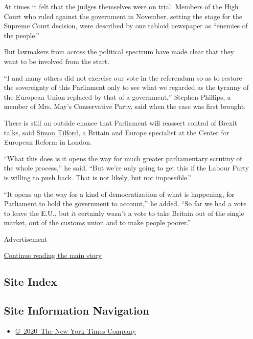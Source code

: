 At times it felt that the judges themselves were on trial. Members of
the High Court who ruled against the government in November, setting the
stage for the Supreme Court decision, were described by one tabloid
newspaper as ``enemies of the people.''

But lawmakers from across the political spectrum have made clear that
they want to be involved from the start.

``I and many others did not exercise our vote in the referendum so as to
restore the sovereignty of this Parliament only to see what we regarded
as the tyranny of the European Union replaced by that of a government,''
Stephen Phillips, a member of Mrs. May's Conservative Party, said when
the case was first brought.

There is still an outside chance that Parliament will reassert control
of Brexit talks, said
\href{https://www.cer.org.uk/personnel/simon-tilford}{Simon Tilford}, a
Britain and Europe specialist at the Center for European Reform in
London.

``What this does is it opens the way for much greater parliamentary
scrutiny of the whole process,'' he said. ``But we're only going to get
this if the Labour Party is willing to push back. That is not likely,
but not impossible.''

``It opens up the way for a kind of democratization of what is
happening, for Parliament to hold the government to account,'' he added.
``So far we had a vote to leave the E.U., but it certainly wasn't a vote
to take Britain out of the single market, out of the customs union and
to make people poorer.''

Advertisement

\protect\hyperlink{after-bottom}{Continue reading the main story}

\hypertarget{site-index}{%
\subsection{Site Index}\label{site-index}}

\hypertarget{site-information-navigation}{%
\subsection{Site Information
Navigation}\label{site-information-navigation}}

\begin{itemize}
\tightlist
\item
  \href{https://help.nytimes.com/hc/en-us/articles/115014792127-Copyright-notice}{©~2020~The
  New York Times Company}
\end{itemize}

